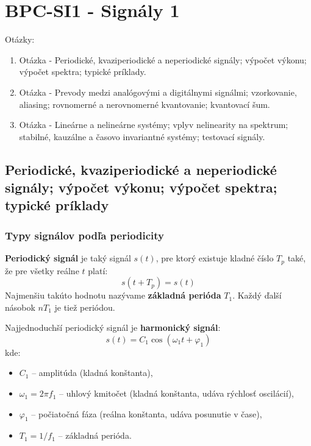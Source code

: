 \graphicspath{{./Obrazky/SI1/}}   %

\part{BPC-SI1 - Signály 1}
\begin{huge}
	Otázky:
	\newline
\end{huge}
\begin{enumerate}
	\item Otázka - Periodické, kvaziperiodické a neperiodické signály; výpočet výkonu; výpočet spektra; typické príklady.
	\item Otázka - Prevody medzi analógovými a digitálnymi signálmi; vzorkovanie, aliasing; rovnomerné a nerovnomerné kvantovanie; kvantovací šum.
	\item Otázka - Lineárne a nelineárne systémy; vplyv nelinearity na spektrum; stabilné, kauzálne a časovo invariantné systémy; testovací signály.
\end{enumerate}
\newpage

\chapter{Periodické, kvaziperiodické a neperiodické signály;
výpočet výkonu; výpočet spektra; typické príklady}

\section{Typy signálov podľa periodicity}

\textbf{Periodický signál} je taký signál $s(t)$, pre ktorý existuje kladné číslo $T_p$ také, že pre všetky reálne $t$ platí:
\begin{equation}
  s(t + T_p) = s(t)
\end{equation}
Najmenšiu takúto hodnotu nazývame \textbf{základná perióda} $T_1$. Každý ďalší násobok $nT_1$ je tiež periódou.

Najjednoduchší periodický signál je \textbf{harmonický signál}:
\begin{equation}
  s(t) = C_1 \cos(\omega_1 t + \varphi_1)
\end{equation}
kde:
\begin{itemize}
  \item $C_1$ -- amplitúda (kladná konštanta),
  \item $\omega_1 = 2\pi f_1$ -- uhlový kmitočet (kladná konštanta, udáva rýchlosť oscilácií),
  \item $\varphi_1$ -- počiatočná fáza (reálna konštanta, udáva posunutie v čase),
  \item $T_1 = 1/f_1$ -- základná perióda.
\end{itemize}

